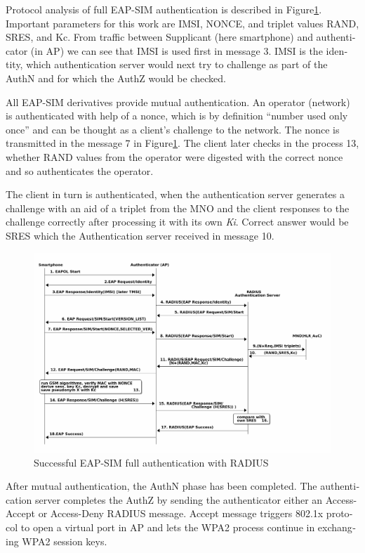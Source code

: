 \documentclass[12pt,a4paper,english]{tutthesis}
\begin{document}
\begin{otherlanguage}{english}
Protocol analysis of full EAP-SIM authentication is described 
in Figure\ref{fig:eap-sim-radius}.
Important parameters for this work are IMSI, NONCE, and triplet values
RAND, SRES, and Kc. 
From traffic between Supplicant (here smartphone) and authenticator (in AP)
we can see that IMSI is used first in message 3. IMSI is the
identity, which authentication server would next try to challenge as
part of the AuthN and for which the AuthZ would be checked.







All EAP-SIM derivatives provide mutual authentication.
An operator (network) is authenticated with help of a nonce,
which is by definition ``number used only once'' and can
be thought as a client's challenge to the network.
The nonce is transmitted in the message 7 in Figure\ref{fig:eap-sim-radius}.
The client later checks in the process 13, whether RAND values from
the operator were digested with the correct nonce and so authenticates
the operator.

The client in turn is authenticated, when the authentication server
generates a challenge with an aid of a triplet from the MNO and the
client responses to the challenge correctly after processing it with
its own \emph{Ki}.  Correct answer would be SRES which the Authentication
server received in message 10.
\begin{figure}[htb]
\centering
\includegraphics[width=.9\linewidth]{eap-sim-radius.png}
\caption{\label{fig:eap-sim-radius}Successful EAP-SIM full authentication with RADIUS}
\end{figure}



After mutual authentication, the AuthN phase has been completed. The
authentication server completes the AuthZ by sending the authenticator either
an Access-Accept or Access-Deny RADIUS message. 
Accept message triggers 802.1x protocol to open a virtual port in AP
and lets the WPA2 process continue in exchanging WPA2 session keys. 


\end{otherlanguage}
\end{document}
